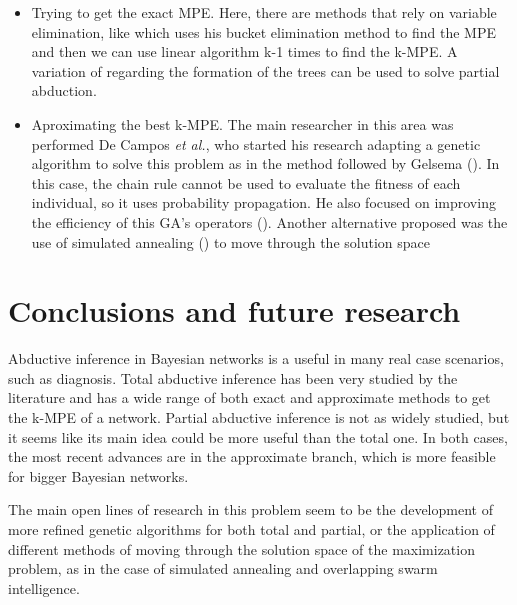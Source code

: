 \documentclass[a4paper,11pt]{article}
\begin{document}
\begin{itemize}

\item Trying to get the exact MPE. Here, there are methods that rely on variable elimination, like \cite{dechter1998} which uses his bucket elimination method to find the MPE and then we can use \cite{li1993} linear algorithm k-1 times to find the k-MPE. A variation of \cite{nilsson1998} regarding the formation of the trees can be used to solve partial abduction. 

\item Aproximating the best k-MPE. The main researcher in this area was performed De Campos \textit{et al.}, who started his research adapting a genetic algorithm to solve this problem as in the method followed by Gelsema (\cite{deCampos1999}). In this case, the chain rule cannot be used to evaluate the fitness of each individual, so it uses probability propagation. He also focused on improving the efficiency of this GA's operators (\cite{deCampos2002}). Another alternative proposed was the use of simulated annealing (\cite{deCampos2001}) to move through the solution space

\end{itemize}

\section{Conclusions and future research}

Abductive inference in Bayesian networks is a useful in many real case scenarios, such as diagnosis. Total abductive inference has been very studied by the literature and has a wide range of both exact and approximate methods to get the k-MPE of a network. Partial abductive inference is not as widely studied, but it seems like its main idea could be more useful than the total one. In both cases, the most recent advances are in the approximate branch, which is more feasible for bigger Bayesian networks.

The main open lines of research in this problem seem to be the development of more refined genetic algorithms for both total and partial, or the application of different methods of moving through the solution space of the maximization problem, as in the case of simulated annealing and overlapping swarm intelligence.
\end{document}
